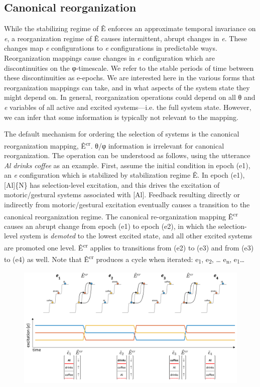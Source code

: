 \subsection{Canonical reorganization}

While the stabilizing regime of Ê enforces an approximate temporal invariance on \textit{e}, a reorganization regime of Ê causes intermittent, abrupt changes in \textit{e}. These changes map \textit{e} configurations to \textit{e} configurations in predictable ways. Reorganization mappings cause changes in \textit{e} configuration which are discontinuities on the φ-timescale. We refer to the stable periods of time between these discontinuities as e-epochs. We are interested here in the various forms that reorganization mappings can take, and in what aspects of the system state they might depend on. In general, reorganization operations could depend on all θ and \textit{e} variables of all active and excited systems—i.e. the full system state. However, we can infer that some information is typically not relevant to the mapping. 

  The default mechanism for ordering the selection of systems is the canonical reorganization mapping, Ê\textsuperscript{cr}. θ/φ information is irrelevant for canonical reorganization. The operation  can be understood as follows, using the utterance \textit{Al} \textit{drinks} \textit{coffee} as an example. First, assume the initial condition in epoch (e1), an \textit{e} configuration which is stabilized by stabilization regime Ê. In epoch (e1), [Al]\{N\} has selection-level excitation, and this drives the excitation of motoric/gestural systems associated with [Al]. Feedback resulting directly or indirectly from motoric/gestural excitation eventually causes a transition to the canonical reorganization regime. The canonical re-organization mapping Ê\textsuperscript{cr} causes an abrupt change from epoch (e1) to epoch (e2), in which the selection-level system is \textit{demoted} to the lowest excited state, and all other excited systems are promoted one level. Ê\textsuperscript{cr} applies to transitions from (e2) to (e3) and from (e3) to (e4) as well. Note that Ê\textsuperscript{cr} produces a cycle when iterated: e\textsubscript{1}, e\textsubscript{2}, … e\textsubscript{n}, e\textsubscript{1}… 

  
\begin{figure}
\includegraphics[width=\textwidth]{figures/Tilsen-img25.png}
\caption{\missingcaption}
\label{fig:}
\end{figure}
 

